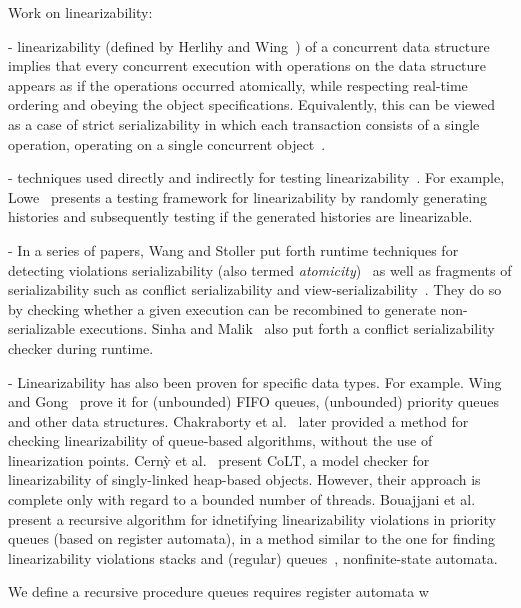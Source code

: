 Work on linearizability:

- linearizability (defined by Herlihy and Wing~\cite{HeWe87, HeWi90}) of a concurrent data structure implies that every concurrent execution with operations on the data structure appears as if the operations occurred atomically, while respecting real-time ordering and obeying the object specifications. 
%
Equivalently, this can be viewed as a case of strict serializability in which each transaction consists of a single operation, operating on a single concurrent object~\cite{WaSt06a}.




- techniques used directly and indirectly for testing 
linearizability~\cite{WiGo93, PrGr12, PrGr13, EmEn17}. For example, 
Lowe~\cite{Lo17} presents a testing framework for linearizability by randomly 
generating histories and subsequently testing if the generated histories are 
linearizable.

- In a series of papers, Wang and Stoller put forth runtime techniques for detecting violations serializability (also termed \textit{atomicity})~\cite{WaSt06a} as well as fragments of serializability such as conflict serializability and view-serializability~\cite{WaSt06b}. They do so by  checking whether a given execution can be recombined to generate non-serializable executions.
%
Sinha and Malik~\cite{SiMa10} also put forth a conflict serializability checker during runtime.

- Linearizability has also been proven for specific data types. For example. 
Wing and Gong~\cite{WiGo93} prove it for  (unbounded) FIFO queues, (unbounded) 
priority queues and other data structures. Chakraborty et al.~\cite{ChHeSeVa15} 
later provided a method for checking linearizability of queue-based algorithms, 
without the use of linearization points. Cern{\`y} et al.~\cite{CeRaZuChAl10} 
present CoLT, a model checker for linearizability of singly-linked heap-based 
objects. However, their approach is complete only with regard to a bounded 
number of threads. 
%
Bouajjani et al.~\cite{BoEnWa17} present a recursive algorithm for idnetifying 
linearizability violations in priority queues (based on register automata), in 
a method similar to the one for finding linearizability violations stacks and 
(regular) queues~\cite{BoEmEnHa18}, nonfinite-state automata.



We define a recursive procedure
queues requires register automata w




